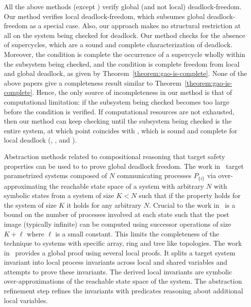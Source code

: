 All the above methods (except ) verify global (and not
local) deadlock-freedom.  Our method verifies local deadlock-freedom, which subsumes 
global deadlock-freedom as a special case.
Also, our approach makes no
structural restriction at all on the system being checked for deadlock.  Our method checks
for the absence of supercycles, which are a sound and complete characterization of
deadlock. Moreover, the \LAO condition is complete \wrt the occurrence of a supercycle wholly
within the subsystem being checked, and the \GAO condition is complete
\wrt freedom from local and global deadlock, as given by
Theorem~\ref{theorem:gao-is-complete}.
None of the above papers give a completeness result similar to 
Theorem~\ref{theorem:gao-is-complete}.
%
Hence, the only source of incompleteness in our method is that of computational
limitation: if the subsystem being checked becomes too large before 
the \LAO condition is verified. If computational resources are not exhausted, then our
method can keep checking until the subsystem being checked is the entire system, at which
point \LAO coincides with \GAO, which is sound and complete for local deadlock
(, , and ).


Abstraction methods related to compositional reasoning
\cite{AbdullaHH13VMCAI,PnueliRZ01TACAS,CohenN09FMSD}
that target safety properties can be used to to prove
global deadlock freedom. 
%
The work in~\cite{AbdullaHH13VMCAI,PnueliRZ01TACAS,CohenN09FMSD}
target parametrized systems composed of $N$ communicating processes $P_{\{i\}}$ 
via over-approximating the reachable state space of a system with 
arbitrary $N$ with symbolic states from a system of size $K<N$ such that
if the property holds for the system of size $K$ it holds for any arbitrary $N$.
%
Crucial to the work in~\cite{AbdullaHH13VMCAI} is a bound on the number of processes
involved at each state such that the post image (typically infinite) can be 
computed using successor operations of size $K+\ell$ where $\ell$ is a small 
constant. This limits the completeness of the technique to systems with specific
array, ring and tree like topologies. 
%
The work in~\cite{CohenN09FMSD} provides a global proof using 
several local proofs. 
It splits a target system invariant into local process invariants across 
local and shared variables and attempts to prove these invariants. 
The derived local invariants are symbolic over-approximations of the reachable 
state space of the system. 
The abstraction refinement step refines the invariants with predicates reasoning 
about additional local variables. 

